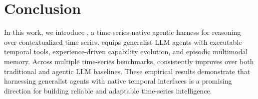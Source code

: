 \section{Conclusion}
\label{sec:conclusion}

In this work, we introduce \method, a time-series-native agentic harness for reasoning over contextualized time series. \method equips generalist LLM agents with executable temporal tools, experience-driven capability evolution, and episodic multimodal memory. Across multiple time-series benchmarks, \method consistently improves over both traditional and agentic LLM baselines. These empirical results demonstrate that harnessing generalist agents with native temporal interfaces is a promising direction for building reliable and adaptable time-series intelligence.


\clearpage